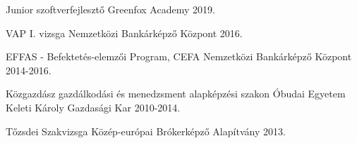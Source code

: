 

\begin{cventries}

   \cventry
    {Junior szoftverfejlesztő} %
    {Greenfox Academy} %
    {} %
    {2019.} %
    {
    } 
  \vspace{-2.0mm}
  
  \cventry
    {VAP I. vizsga} %
    {Nemzetközi Bankárképző Központ} %
    {} %
    {2016.} %
    {
    }
  \vspace{-2.0mm}
  
  \cventry
    {EFFAS - Befektetés-elemzői Program, CEFA} %
    {Nemzetközi Bankárképző Központ} %
    {} %
    {2014-2016.} %
    {
    }
  \vspace{-2.0mm}

  \cventry
    {Közgazdász gazdálkodási és menedzsment alapképzési szakon} %
    {Óbudai Egyetem Keleti Károly Gazdasági Kar} %
    {} %
    {2010-2014.} %
    {
    }
  \vspace{-2.0mm}

  \cventry
    {Tőzsdei Szakvizsga} %
    {Közép-európai Brókerképző Alapítvány} %
    {} %
    {2013.} %
    {
    }
    \vspace{-2.0mm}


\end{cventries}
